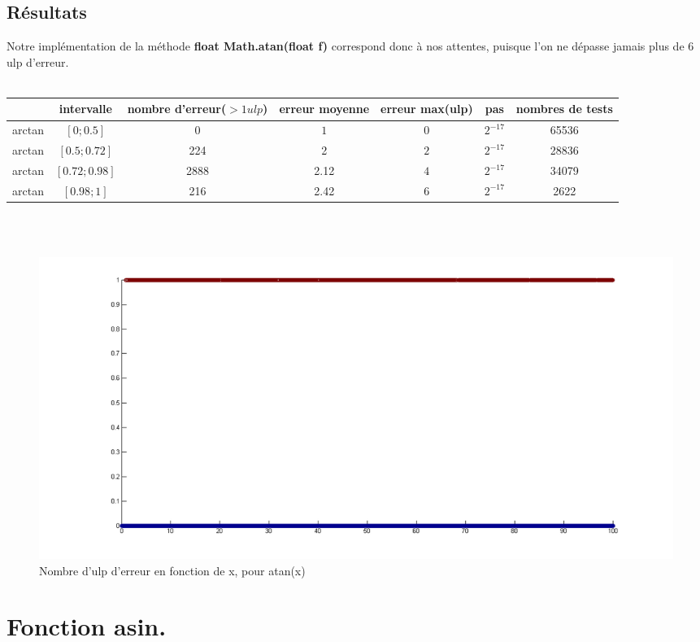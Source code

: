 \documentclass[a4,12pt]{article}
\begin{document}
\subsection{Résultats}
Notre implémentation de la méthode \textbf{float Math.atan(float f)} correspond donc à nos attentes, puisque l'on ne dépasse jamais plus de 6 ulp d'erreur.\\
\\

\hspace{-4cm}
\begin{tabular}{|c|c|c|c|c|c|c|}

\hline 
 & intervalle & nombre d'erreur($ > 1 ulp$) & erreur moyenne & erreur max(ulp) & pas & nombres de tests \\
\hline 
arctan & $[0;0.5]$ & 0 & $1$ & 0 &$2^{-17}$ & 65536\\
\hline
arctan & $[0.5;0.72]$ & 224 & 2 &$2$ & $2^{-17}$ & 28836\\
\hline
arctan & $[0.72;0.98]$ & 2888 & 2.12 &$4$ & $2^{-17}$ & 34079\\
\hline
arctan & $[0.98;1]$ & 216 & 2.42 &$6$ & $2^{-17}$ & 2622\\
\hline
\end{tabular}
\\
\\


\begin{figure}[h!]
    \centering
    \hspace{-5cm}
    \includegraphics[scale=0.5]{atan100}
    \caption{Nombre d'ulp d'erreur en fonction de x, pour atan(x)}
    \label{fig:my_label}
\end{figure}

\clearpage
\section{Fonction asin.}
\end{document}
